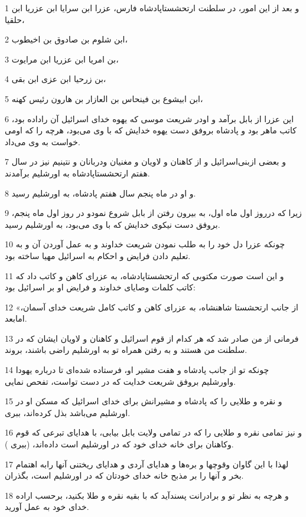 \par 1 و بعد از این امور، در سلطنت ارتحشستاپادشاه فارس، عزرا ابن سرایا ابن عزریا ابن حلقیا،
\par 2 ابن شلوم بن صادوق بن اخیطوب،
\par 3 بن امریا ابن عزریا ابن مرایوت،
\par 4 بن زرحیا ابن عزی ابن بقی،
\par 5 ابن ابیشوع بن فینحاس بن العازار بن هارون رئیس کهنه،
\par 6 این عزرا از بابل برآمد و اودر شریعت موسی که یهوه خدای اسرائیل آن راداده بود، کاتب ماهر بود و پادشاه بروفق دست یهوه خدایش که با وی می‌بود، هر‌چه را که اومی خواست به وی می‌داد.
\par 7 و بعضی ازبنی‌اسرائیل و از کاهنان و لاویان و مغنیان ودربانان و نتینیم نیز در سال هفتم ارتحشستاپادشاه به اورشلیم برآمدند.
\par 8 و او در ماه پنجم سال هفتم پادشاه، به اورشلیم رسید.
\par 9 زیرا که درروز اول ماه اول، به بیرون رفتن از بابل شروع نمودو در روز اول ماه پنجم، بروفق دست نیکوی خدایش که با وی می‌بود، به اورشلیم رسید.
\par 10 چونکه عزرا دل خود را به طلب نمودن شریعت خداوند و به عمل آوردن آن و به تعلیم دادن فرایض و احکام به اسرائیل مهیا ساخته بود.
\par 11 و این است صورت مکتوبی که ارتحشستاپادشاه، به عزرای کاهن و کاتب داد که کاتب کلمات وصایای خداوند و فرایض او بر اسرائیل بود:
\par 12 «از جانب ارتحشستا شاهنشاه، به عزرای کاهن و کاتب کامل شریعت خدای آسمان، امابعد.
\par 13 فرمانی از من صادر شد که هر کدام از قوم اسرائیل و کاهنان و لاویان ایشان که در سلطنت من هستند و به رفتن همراه تو به اورشلیم راضی باشند، بروند.
\par 14 چونکه تو از جانب پادشاه و هفت مشیر او، فرستاده شده‌ای تا درباره یهودا واورشلیم بروفق شریعت خدایت که در دست تواست، تفحص نمایی.
\par 15 و نقره و طلایی را که پادشاه و مشیرانش برای خدای اسرائیل که مسکن او در اورشلیم می‌باشد بذل کرده‌اند، ببری.
\par 16 و نیز تمامی نقره و طلایی را که در تمامی ولایت بابل بیابی، با هدایای تبرعی که قوم وکاهنان برای خانه خدای خود که در اورشلیم است داده‌اند، (ببری ).
\par 17 لهذا با این گاوان وقوچها و بره‌ها و هدایای آردی و هدایای ریختنی آنها رابه اهتمام بخر و آنها را بر مذبح خانه خدای خودتان که در اورشلیم است، بگذران.
\par 18 و هر‌چه به نظر تو و برادرانت پسندآید که با بقیه نقره و طلا بکنید، برحسب اراده خدای خود به عمل آورید. 
